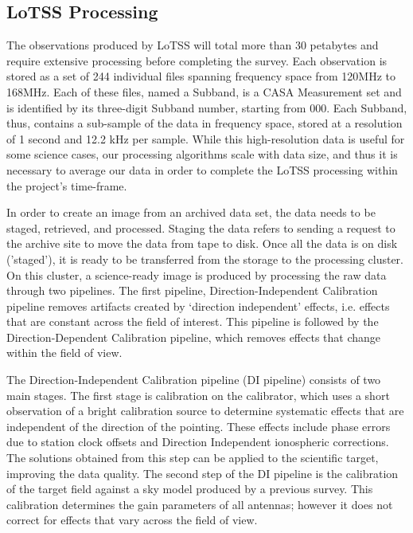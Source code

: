 \subsection{LoTSS Processing}

The observations produced by LoTSS will total more than 30 petabytes and require extensive processing before completing the survey. Each observation is stored as a set of 244 individual files spanning frequency space from 120MHz to 168MHz. Each of these files, named a Subband, is a CASA Measurement set\citep{casacore_ms} and is identified by its three-digit Subband number, starting from 000. Each Subband, thus, contains a sub-sample of the data in frequency space, stored at a resolution of 1 second and 12.2 kHz per sample. While this high-resolution data is useful for some science cases, our processing algorithms scale with data size, and thus it is necessary to average our data in order to complete the LoTSS processing within the project's time-frame. 

In order to create an image from an archived data set, the data needs to be staged, retrieved, and processed. Staging the data refers to sending a request to the archive site to move the data from tape to disk. Once all the data is on disk ('staged'), it is ready to be transferred from the storage to the processing cluster. On this cluster, a science-ready image is produced by processing the raw data through two pipelines. The first pipeline, Direction-Independent Calibration pipeline removes artifacts created by `direction independent' effects, i.e. effects that are constant across the field of interest. This pipeline is followed by the Direction-Dependent Calibration pipeline, which removes effects that change within the field of view.
 
The Direction-Independent Calibration pipeline (DI pipeline) consists of two main stages. The first stage is calibration on the calibrator, which uses a short observation of a bright calibration source to determine systematic effects that are independent of the direction of the pointing. These effects include phase errors due to station clock offsets and Direction Independent ionospheric corrections. The solutions obtained from this step can be applied to the scientific target, improving the data quality. The second step of the DI pipeline is the calibration of the target field against a sky model produced by a previous survey. This calibration determines the gain parameters of all antennas; however it does not correct for effects that vary across the field of view. 
 

